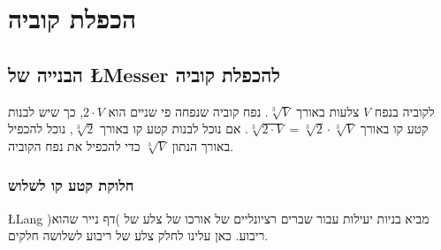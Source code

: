 
\chapter{הכפלת קוביה}\label{c.cube}

\section{%
הבנייה של 
\L{Messer}
להכפלת קוביה}%
\label{s.cube1}

לקוביה בנפח 
$V$
צלעות באורך
$\sqrt[3]{V}$.
נפח קוביה שנפחה פי שניים הוא
 $2\cdot V$,
 כך שיש לבנות קטע קו באורך
$\sqrt[3]{2\cdot V}=\sqrt[3]{2}\cdot \sqrt[3]{V}$.
אם נוכל לבנות קטע קו באורך
$\sqrt[3]{2}$,
נוכל להכפיל באורך הנתון
$\sqrt[3]{V}$
כדי להכפיל את נפח הקוביה.

\subsection{חלוקת קטע קו לשלוש}

\L{Lang \cite{lang}}
מביא בניות יעילות עבור שברים רציונליים של אורכו של צלע של )דף נייר שהוא( ריבוע. כאן עלינו לחלק צלע של ריבוע לשלושה חלקים.

